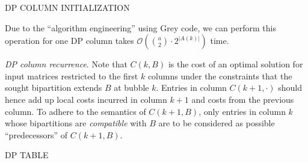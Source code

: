 \begin{algorithm}
    \caption{\label{alg:dp-column}\textsc{DP COLUMN INITIALIZATION}}
\end{algorithm}

Due to the ``algorithm engineering'' using Grey code, we can perform this operation for one DP column takes $\mathcal{O}( {a \choose 2} \cdot 2^{|A(k)|})$ time.

\textit{DP column recurrence}.
Note that $C(k,B)$ is the cost of an optimal solution for input matrices restricted to the first $k$ columns under the constraints that the sought bipartition extends $B$ at bubble $k$.
Entries in column $C(k+1,\cdot)$ should hence add up local costs incurred in column $k+1$ and costs from the previous column. 
To adhere to the semantics of $C(k+1,B)$, only entries in column $k$ whose bipartitions are \emph{compatible} with $B$ are to be considered as possible ``predecessors'' of $C(k+1, B)$.

\begin{algorithm}
    \caption{\label{alg:dp-table}\textsc{DP TABLE}}
\end{algorithm}

